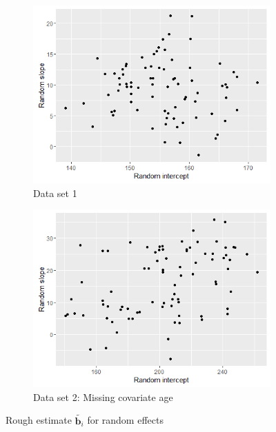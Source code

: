 \begin{figure}[!htb]
\centering
\captionsetup{justification=centering}
	\begin{subfigure}[b]{0.4\textwidth}
		\includegraphics[width=\textwidth]{mainmatter/chapter_5_simulation_study/ds_simple_randplot.png}
       \caption{\label{fig : ds_simple_randplot}Data set 1}
	\end{subfigure}    
	\begin{subfigure}[b]{0.4\textwidth}
		\includegraphics[width=\textwidth]{mainmatter/chapter_5_simulation_study/missing_continuous_covariate_randplot.png}
       \caption{\label{fig : missing_continuous_covariate_randplot} Data set 2: Missing covariate age}
	\end{subfigure}     
\caption{\label{fig : ds_simple_n_3wellsep}Rough estimate $\tilde{\boldsymbol{b}_i}$ for random effects}
\end{figure}

